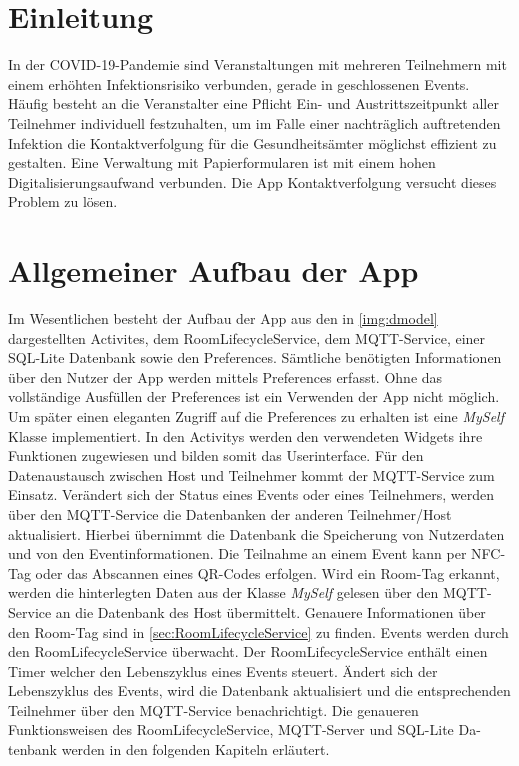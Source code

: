 \sloppy
\section{Einleitung}
\label{sec:Einleitung}
In der COVID-19-Pandemie sind Veranstaltungen mit mehreren Teilnehmern mit einem erhöhten Infektionsrisiko verbunden, gerade in geschlossenen Events.
Häufig besteht an die Veranstalter eine Pflicht Ein- und Austrittszeitpunkt aller Teilnehmer individuell festzuhalten, um im Falle einer nachträglich auftretenden Infektion die Kontaktverfolgung für die Gesundheitsämter möglichst effizient zu gestalten.
Eine Verwaltung mit Papierformularen ist mit einem hohen Digitalisierungsaufwand verbunden.
Die App Kontaktverfolgung versucht dieses Problem zu lösen.

\section{Allgemeiner Aufbau der App}
\label{sec:AadA}
Im Wesentlichen besteht der Aufbau der App aus den in \cref{img:dmodel} dargestellten Activites, dem RoomLifecycleService, dem MQTT-Service, einer SQL-Lite Datenbank sowie den Preferences. 
Sämtliche benötigten Informationen über den Nutzer der App werden mittels Preferences erfasst. 
Ohne das vollständige Ausfüllen der Preferences ist ein Verwenden der App nicht möglich. 
Um später einen eleganten Zugriff auf die Preferences zu erhalten ist eine \textit{MySelf} Klasse implementiert. 
In den Activitys werden den verwendeten Widgets ihre Funktionen zugewiesen und bilden somit das Userinterface. 
Für den Datenaustausch zwischen Host und Teilnehmer kommt der MQTT-Service zum Einsatz. 
Verändert sich der Status eines Events oder eines Teilnehmers, werden über den MQTT-Service die Datenbanken der anderen Teilnehmer/Host aktualisiert. 
Hierbei übernimmt die Datenbank die Speicherung von Nutzerdaten und von den Eventinformationen. 
Die Teilnahme an einem Event kann per NFC-Tag oder das Abscannen eines QR-Codes erfolgen. 
Wird ein Room-Tag erkannt, werden die hinterlegten Daten aus der Klasse \textit{MySelf} gelesen über den MQTT-Service an die Datenbank des Host übermittelt. 
Genauere Informationen über den Room-Tag sind in \cref{sec:RoomLifecycleService} zu finden.
Events werden durch den RoomLifecycleService überwacht. Der RoomLifecycleService enthält einen Timer welcher den Lebenszyklus eines Events steuert. 
Ändert sich der Lebenszyklus des Events, wird die Datenbank aktualisiert und die entsprechenden Teilnehmer über den MQTT-Service benachrichtigt. 
Die genaueren Funktionsweisen des RoomLifecycleService, MQTT-Server und SQL-Lite Da-tenbank werden in den folgenden Kapiteln erläutert.
